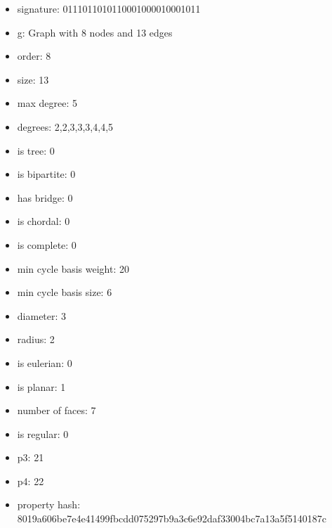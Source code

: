 \begin{itemize}
\item signature: 0111011010110001000010001011
\item g: Graph with 8 nodes and 13 edges
\item order: 8
\item size: 13
\item max degree: 5
\item degrees: 2,2,3,3,3,4,4,5
\item is tree: 0
\item is bipartite: 0
\item has bridge: 0
\item is chordal: 0
\item is complete: 0
\item min cycle basis weight: 20
\item min cycle basis size: 6
\item diameter: 3
\item radius: 2
\item is eulerian: 0
\item is planar: 1
\item number of faces: 7
\item is regular: 0
\item p3: 21
\item p4: 22
\item property hash: 8019a606be7e4e41499fbcdd075297b9a3c6e92daf33004bc7a13a5f5140187c
\end{itemize}
\newpage
\begin{figure}
\end{figure}
